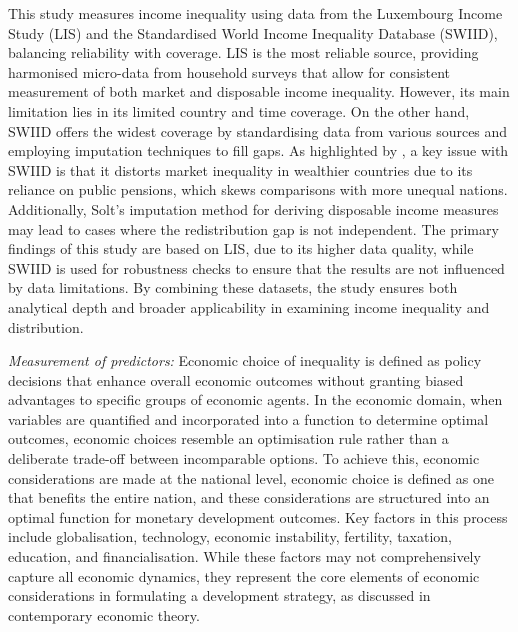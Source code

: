 This study measures income inequality using data from the Luxembourg Income Study (LIS) and the Standardised World Income Inequality Database (SWIID), balancing reliability with coverage. LIS is the most reliable source, providing harmonised micro-data from household surveys that allow for consistent measurement of both market and disposable income inequality. However, its main limitation lies in its limited country and time coverage. On the other hand, SWIID offers the widest coverage by standardising data from various sources and employing imputation techniques to fill gaps. As highlighted by \textcite{galbraith2014utip}, a key issue with SWIID is that it distorts market inequality in wealthier countries due to its reliance on public pensions, which skews comparisons with more unequal nations. Additionally, Solt's imputation method for deriving disposable income measures may lead to cases where the redistribution gap is not independent. The primary findings of this study are based on LIS, due to its higher data quality, while SWIID is used for robustness checks to ensure that the results are not influenced by data limitations. By combining these datasets, the study ensures both analytical depth and broader applicability in examining income inequality and distribution.

\textit{Measurement of predictors:} Economic choice of inequality is defined as policy decisions that enhance overall economic outcomes without granting biased advantages to specific groups of economic agents. In the economic domain, when variables are quantified and incorporated into a function to determine optimal outcomes, economic choices resemble an optimisation rule rather than a deliberate trade-off between incomparable options. To achieve this, economic considerations are made at the national level, economic choice is defined as one that benefits the entire nation, and these considerations are structured into an optimal function for monetary development outcomes. Key factors in this process include globalisation, technology, economic instability, fertility, taxation, education, and financialisation. While these factors may not comprehensively capture all economic dynamics, they represent the core elements of economic considerations in formulating a development strategy, as discussed in contemporary economic theory. 

